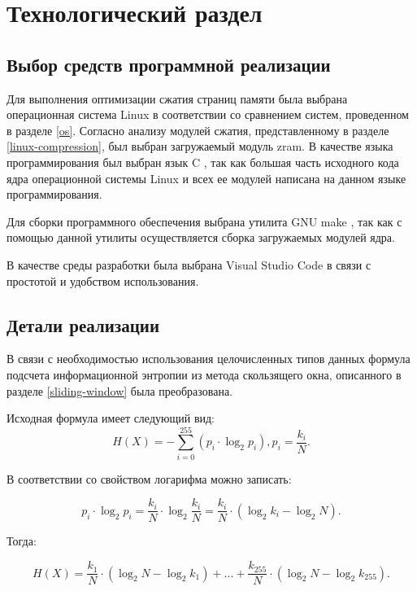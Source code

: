 \chapter{Технологический раздел}

\section{Выбор средств программной реализации}

Для выполнения оптимизации сжатия страниц памяти была выбрана операционная система Linux в соответствии со сравнением систем, проведенном в разделе \ref{os}. Согласно анализу модулей сжатия, представленному в разделе \ref{linux-compression}, был выбран загружаемый модуль zram. В качестве языка программирования был выбран язык C \cite{c}, так как большая часть исходного кода ядра операционной системы Linux и всех ее модулей написана на данном языке программирования.

Для сборки программного обеспечения выбрана утилита GNU make \cite{make}, так как с помощью данной утилиты осуществляется сборка загружаемых модулей ядра.

В качестве среды разработки была выбрана Visual Studio Code \cite{vs-code} в связи с простотой и удобством использования.

\section{Детали реализации}

В связи с необходимостью использования целочисленных типов данных формула подсчета информационной энтропии из метода скользящего окна, описанного в разделе \ref{sliding-window} была преобразована.

Исходная формула имеет следующий вид:
\begin{equation}
    H(X) = -\sum_{i = 0}^{255} (p_{i} \cdot \log_{2}p_{i}), p_{i} = \frac{k_i}{N}.
\end{equation}

В соответствии со свойством логарифма можно записать:

\begin{equation}
    p_{i} \cdot \log_{2}p_{i} = \frac{k_i}{N} \cdot \log_{2}\frac{k_i}{N} =  \frac{k_i}{N} \cdot (\log_{2}k_i - \log_{2}N).
\end{equation}

Тогда:

\begin{equation}
    H(X) = \frac{k_1}{N} \cdot ( \log_{2}N - \log_{2}k_1) + ... + \frac{k_{255}}{N} \cdot (\log_{2}N - \log_{2}k_{255}).
\end{equation}

